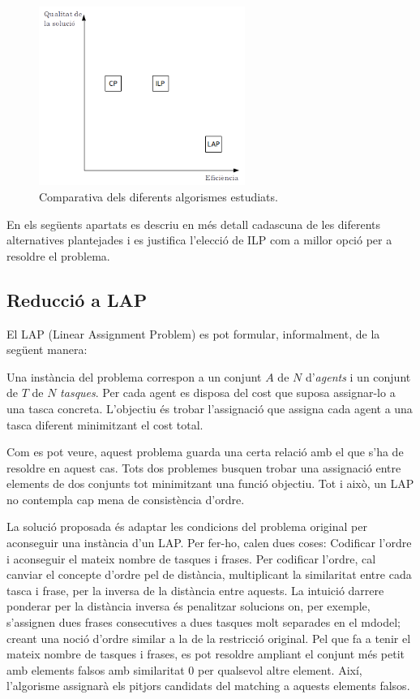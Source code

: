 \begin{figure}[htb]
    \centering
    \includegraphics[width=0.6\textwidth]{figures/algorithm_comparison.png}
    \caption{Comparativa dels diferents algorismes estudiats.}
    \label{fig:comparativa-algorismes}
\end{figure}

En els següents apartats es descriu en més detall cadascuna de les diferents alternatives plantejades i es justifica l'elecció de ILP com a millor opció per a resoldre el problema.

\subsection{Reducció a LAP}
\label{sec:implementacio-lap}

El LAP (Linear Assignment Problem)\cite{LAP} es pot formular, informalment, de la següent manera:
\begin{displayquote}
    Una instància del problema correspon a un conjunt $A$ de $N$ d'\emph{agents} i un conjunt de $T$ de $N$ \emph{tasques}. Per cada agent es disposa del cost que suposa assignar-lo a una tasca concreta. L'objectiu és trobar l'assignació que assigna cada agent a una tasca diferent minimitzant el cost total.
\end{displayquote}

Com es pot veure, aquest problema guarda una certa relació amb el que s'ha de resoldre en aquest cas. Tots dos problemes busquen trobar una assignació entre elements de dos conjunts tot minimitzant una funció objectiu. Tot i això, un LAP no contempla cap mena de consistència d'ordre.

La solució proposada és adaptar les condicions del problema original per aconseguir una instància d'un LAP. Per fer-ho, calen dues coses: Codificar l'ordre i aconseguir el mateix nombre de tasques i frases. Per codificar l'ordre, cal canviar el concepte d'ordre pel de distància, multiplicant la similaritat entre cada tasca i frase, per la inversa de la distància entre aquests. La intuició darrere ponderar per la distància inversa és penalitzar solucions on, per exemple, s'assignen dues frases consecutives a dues tasques molt separades en el mdodel; creant una noció d'ordre similar a la de la restricció original. Pel que fa a tenir el mateix nombre de tasques i frases, es pot resoldre ampliant el conjunt més petit amb elements falsos amb similaritat 0 per qualsevol altre element. Així, l'algorisme assignarà els pitjors candidats del matching a aquests elements falsos.

